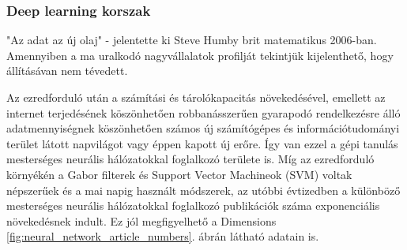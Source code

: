 \subsubsection*{Deep learning korszak}
"Az adat az új olaj" - jelentette ki Steve Humby brit matematikus 2006-ban. Amennyiben a ma uralkodó nagyvállalatok profilját tekintjük kijelenthető, hogy állításávan nem tévedett.

Az ezredforduló után a számítási és tárolókapacitás növekedésével, emellett az internet terjedésének köszönhetően robbanásszerűen gyarapodó rendelkezésre álló adatmennyiségnek köszönhetően számos új számítógépes és információtudományi terület látott napvilágot vagy éppen kapott új erőre. Így van ezzel a gépi tanulás mesterséges neurális hálózatokkal foglalkozó területe is. Míg az ezredforduló környékén a Gabor filterek és Support Vector Machineok (SVM) voltak népszerűek és a mai napig használt módszerek, az utóbbi évtizedben a különböző mesterséges neurális hálózatokkal foglalkozó publikációk száma exponenciális növekedésnek indult. Ez jól megfigyelhető a Dimensions\cite{noauthor_dimensions_nodate} \ref{fig:neural_network_article_numbers}. ábrán látható adatain is.

